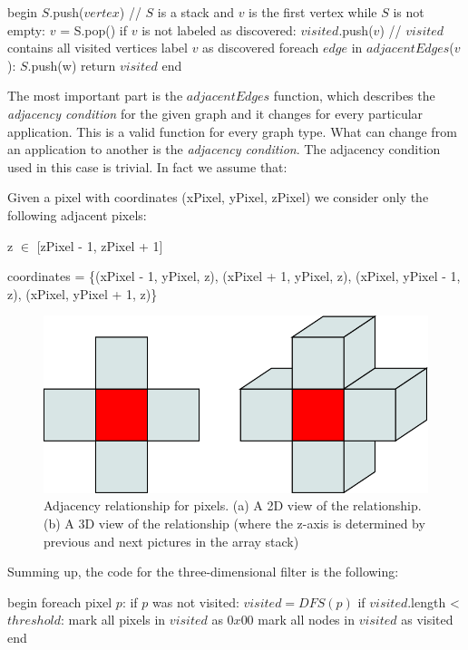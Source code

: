\begin{pseudo}[caption={DFS visit}, label={lst:DFS}]
begin
  $S$.push($vertex$) // $S$ is a stack and $v$ is the first vertex
  while $S$ is not empty:
    $v$ = S.pop()
    if $v$ is not labeled as discovered:
      $visited$.push($v$) // $visited$ contains all visited vertices
      label $v$ as discovered
      foreach $edge$ in $adjacentEdges$($v$):
        $S$.push(w)
  return $visited$
end       
\end{pseudo}

The most important part is the $adjacentEdges$ function, which describes the \textit{adjacency condition} for the given graph and it changes for every particular application. This is a valid function for every graph type. What can change from an application to another is the \textit{adjacency condition}. The adjacency condition used in this case is trivial. In fact we assume that:
\begin{definition}
Given a pixel with coordinates (xPixel, yPixel, zPixel) we consider only the following adjacent pixels:
\begin{description}
 \item z $\in$ [zPixel - 1, zPixel + 1]
 \item coordinates = \{(xPixel - 1, yPixel, z), (xPixel + 1, yPixel, z), (xPixel, yPixel - 1, z), (xPixel, yPixel + 1, z)\}
\end{description}
\end{definition}

\begin{figure}[htb]
  \begin{center}
    \includegraphics[width=0.60\linewidth]{images/PixelAdjacency.png}
  \end{center}
  \caption[Adjacency relationship for pixels]{Adjacency relationship for pixels. (a) A 2D view of the relationship. (b) A 3D view of the relationship (where the z-axis is determined by previous and next pictures in the array stack)}
  \label{fig:pixelAdj}
\end{figure}

Summing up, the code for the three-dimensional filter is the following:

\begin{pseudo}[caption={3D filter}, label={lst:3DFilter}]
begin
  foreach pixel $p$:
    if $p$ was not visited:
      $visited = DFS(p) $
      if $visited$.length < $threshold$:
        mark all pixels in $visited$ as $0x00$
      mark all nodes in $visited$ as visited
end       
\end{pseudo}